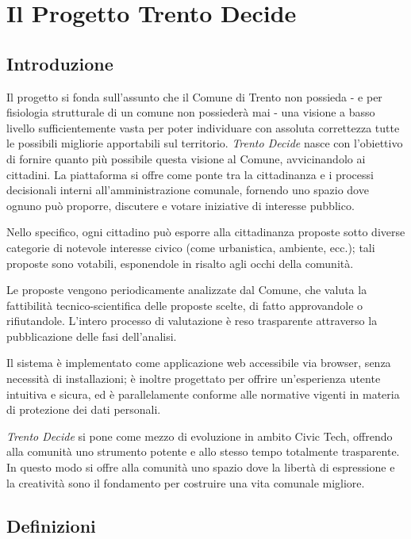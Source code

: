 \chapter{Il Progetto Trento Decide}

\section{Introduzione}

Il progetto si fonda sull'assunto che il Comune di Trento non possieda - e per fisiologia strutturale di un comune non possiederà mai - una visione a basso livello sufficientemente vasta per poter individuare con assoluta correttezza tutte le possibili migliorie apportabili sul territorio.
\emph{Trento Decide} nasce con l'obiettivo di fornire quanto più possibile questa visione al Comune, avvicinandolo ai cittadini.
La piattaforma si offre come ponte tra la cittadinanza e i processi decisionali interni all'amministrazione comunale, fornendo uno spazio dove ognuno può proporre, discutere e votare iniziative di interesse pubblico.

Nello specifico, ogni cittadino può esporre alla cittadinanza proposte sotto diverse categorie di notevole interesse civico (come urbanistica, ambiente, ecc.); tali proposte sono votabili, esponendole in risalto agli occhi della comunità.

Le proposte vengono periodicamente analizzate dal Comune, che valuta la fattibilità tecnico-scientifica delle proposte scelte, di fatto approvandole o rifiutandole.
L'intero processo di valutazione è reso trasparente attraverso la pubblicazione delle fasi dell'analisi.

Il sistema è implementato come applicazione web accessibile via browser, senza necessità di installazioni; è inoltre progettato per offrire un'esperienza utente intuitiva e sicura, ed è parallelamente conforme alle normative vigenti in materia di protezione dei dati personali.

\emph{Trento Decide} si pone come mezzo di evoluzione in ambito Civic Tech, offrendo alla comunità uno strumento potente e allo stesso tempo totalmente trasparente. 
In questo modo si offre alla comunità uno spazio dove la libertà di espressione e la creatività sono il fondamento per costruire una vita comunale migliore.

\section{Definizioni}

